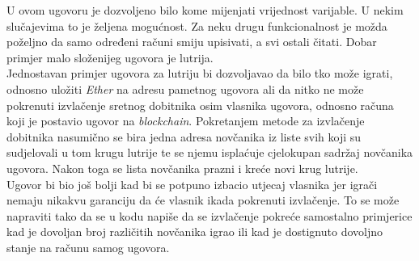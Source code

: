 \documentclass[times, utf8, zavrsni, numeric]{fer}
\begin{document}
U ovom ugovoru je dozvoljeno bilo kome mijenjati vrijednost varijable. U nekim slučajevima to je željena mogućnost. Za neku drugu funkcionalnost je možda poželjno da
samo određeni računi smiju upisivati, a svi ostali čitati. Dobar primjer malo složenijeg ugovora je lutrija. \\
Jednostavan primjer ugovora za lutriju bi dozvoljavao da bilo tko može igrati, odnosno uložiti \emph{Ether} na adresu pametnog ugovora ali da nitko ne može pokrenuti
izvlačenje sretnog dobitnika osim vlasnika ugovora, odnosno računa koji je postavio ugovor na \emph{blockchain}. Pokretanjem metode za izvlačenje dobitnika nasumično
se bira jedna adresa novčanika iz liste svih koji su sudjelovali u tom krugu lutrije te se njemu isplaćuje cjelokupan sadržaj novčanika ugovora. Nakon toga se lista
novčanika prazni i kreće novi krug lutrije. \\
Ugovor bi bio još bolji kad bi se potpuno izbacio utjecaj vlasnika jer igrači nemaju nikakvu garanciju da će vlasnik ikada pokrenuti izvlačenje. To se može napraviti
tako da se u kodu napiše da se izvlačenje pokreće samostalno primjerice kad je dovoljan broj različitih novčanika igrao ili kad je dostignuto dovoljno stanje na računu
samog ugovora.
\end{document}
